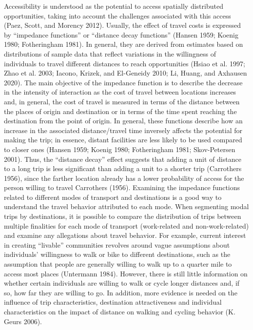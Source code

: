 \documentclass[preprint, 3p,
authoryear]{elsarticle} %
\begin{document}
Accessibility is understood as the potential to access spatially
distributed opportunities, taking into account the challenges associated
with this access (Paez, Scott, and Morency 2012). Usually, the effect of
travel costs is expressed by ``impedance functions'' or ``distance decay
functions'' (Hansen 1959; Koenig 1980; Fotheringham 1981). In general,
they are derived from estimates based on distributions of sample data
that reflect variations in the willingness of individuals to travel
different distances to reach opportunities (Hsiao et al. 1997; Zhao et
al. 2003; Iacono, Krizek, and El-Geneidy 2010; Li, Huang, and Axhausen
2020). The main objective of the impedance function is to describe the
decrease in the intensity of interaction as the cost of travel between
locations increases and, in general, the cost of travel is measured in
terms of the distance between the places of origin and destination or in
terms of the time spent reaching the destination from the point of
origin. In general, these functions describe how an increase in the
associated distance/travel time inversely affects the potential for
making the trip; in essence, distant facilities are less likely to be
used compared to closer ones (Hansen 1959; Koenig 1980; Fotheringham
1981; Skov-Petersen 2001). Thus, the ``distance decay'' effect suggests
that adding a unit of distance to a long trip is less significant than
adding a unit to a shorter trip (Carrothers 1956), since the farther
location already has a lower probability of access for the person
willing to travel Carrothers (1956). Examining the impedance functions
related to different modes of transport and destinations is a good way
to understand the travel behavior attributed to each mode. When
segmenting modal trips by destinations, it is possible to compare the
distribution of trips between multiple finalities for each mode of
transport (work-related and non-work-related) and examine any
allegations about travel behavior. For example, current interest in
creating ``livable'' communities revolves around vague assumptions about
individuals' willingness to walk or bike to different destinations, such
as the assumption that people are generally willing to walk up to a
quarter mile to access most places (Untermann 1984). However, there is
still little information on whether certain individuals are willing to
walk or cycle longer distances and, if so, how far they are willing to
go. In addition, more evidence is needed on the influence of trip
characteristics, destination attractiveness and individual
characteristics on the impact of distance on walking and cycling
behavior (K. Geurs 2006).
\end{document}
